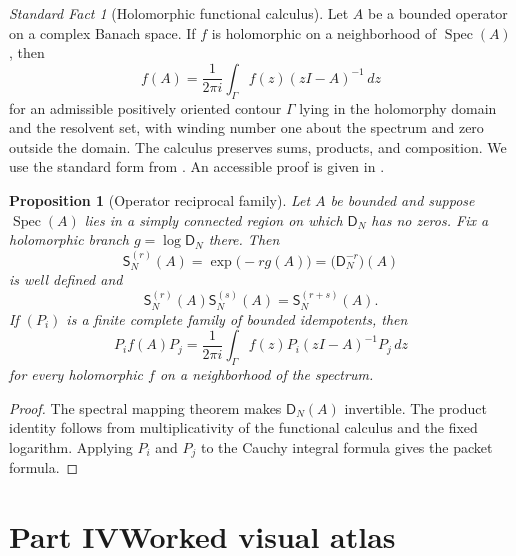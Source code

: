 \documentclass[11pt,letterpaper]{article}
\theoremstyle{plain}
\newtheorem{proposition}[proposition]{Proposition}
\theoremstyle{plain}
\theoremstyle{plain}
\theoremstyle{definition}
\theoremstyle{definition}
\theoremstyle{definition}
\theoremstyle{definition}
\theoremstyle{definition}
\theoremstyle{remark}
\theoremstyle{remark}
\theoremstyle{remark}
\theoremstyle{remark}
\theoremstyle{remark}
\newcommand{\Spec}{\operatorname{Spec}}
\theoremstyle{remark}
\newtheorem{standardfact}[standardfact]{Standard Fact}
\newcommand{\Dfun}{\mathsf D}
\newcommand{\Sfun}{\mathsf S}
\let\KomorebiPrimitivemathsf\mathsf
\renewcommand{\mathsf}[1]{{\KomorebiPrimitivemathsf{#1}}}
\begin{document}
\begin{standardfact}[Holomorphic functional calculus]\label{migration:record:001}\label{migration:sf:holomorphic_calculus}
Let $A$ be a bounded operator on a complex Banach space.  If $f$ is holomorphic on a neighborhood of $\Spec(A)$, then
\[
f(A)
=
\frac1{2\pi i}\int_\Gamma f(z)(zI-A)^{-1}\,dz
\]
for an admissible positively oriented contour $\Gamma$ lying in the holomorphy domain and the resolvent set, with winding number one about the spectrum and zero outside the domain. The calculus preserves sums, products, and composition.  We use the standard form from \cite{DunfordSchwartz1958}. An accessible proof is given in \cite[Appendix A]{TaylorBanachAlgebras}.
\end{standardfact}

\begin{proposition}[Operator reciprocal family]\label{migration:record:002}\label{migration:prop:operator_reciprocal}
Let $A$ be bounded and suppose $\Spec(A)$ lies in a simply connected region on which $\Dfun_N$ has no zeros.  Fix a holomorphic branch $g=\log\Dfun_N$ there.  Then
\[
\Sfun_N^{(r)}(A)
=
\exp\bigl(-r g(A)\bigr)
=
\bigl(\Dfun_N^{-r}\bigr)(A)
\]
is well defined and
\[
\Sfun_N^{(r)}(A)\Sfun_N^{(s)}(A)
=
\Sfun_N^{(r+s)}(A).
\]
If $(P_i)$ is a finite complete family of bounded idempotents, then
\[
P_i f(A)P_j
=
\frac1{2\pi i}
\int_\Gamma
f(z)P_i(zI-A)^{-1}P_j\,dz
\]
for every holomorphic $f$ on a neighborhood of the spectrum.
\end{proposition}

\begin{proof}
The spectral mapping theorem makes $\Dfun_N(A)$ invertible.  The product identity follows from multiplicativity of the functional calculus and the fixed logarithm.  Applying $P_i$ and $P_j$ to the Cauchy integral formula gives the packet formula.
\end{proof}


\clearpage
\part*{Part IV\quad Worked visual atlas}

\clearpage
\end{document}

